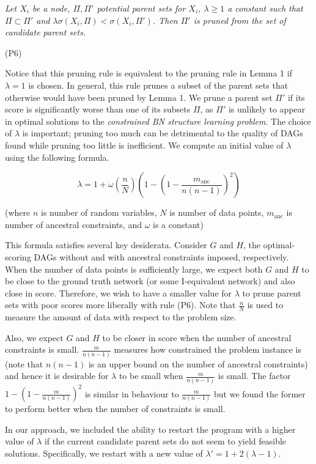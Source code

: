 \documentclass[twoside,11pt]{article}
\begin{document}
\bigskip
\emph{
Let $X_i$ be a node, $\Pi, \Pi'$ potential parent sets for $X_i$, $\lambda \ge 1$ a constant such that 
$\Pi \subset \Pi'$ and $\lambda \sigma(X_i, \Pi) <  \sigma(X_i, \Pi')$. Then $\Pi'$ is
pruned from the set of candidate parent sets.
}
\begin{flushright}
(P6)
\end{flushright}

\bigskip
Notice that this pruning rule is equivalent to the pruning rule in Lemma 1 if $\lambda = 1$ is chosen. In general, this rule prunes a subset of the parent sets that
otherwise would have been pruned by Lemma 1. We prune a parent set $\Pi'$ if its score is significantly worse than one of its subsets $\Pi$, as $\Pi'$ is unlikely to appear in
optimal solutions to the \emph{constrained BN structure learning problem}. The choice of $\lambda$ is important; pruning too much can be detrimental to the quality of DAGs found while pruning too little is inefficient. We compute an initial value of $\lambda$ using the following formula.

$$\lambda = 1 + \omega (\frac{n}{N})(1 - (1 - \frac{m_{\text{anc}}}{n(n-1)})^2)$$

(where $n$ is number of random variables, $N$ is number of data points, $m_{\text{anc}}$ is number of 
ancestral constraints, and $\omega$ is a constant)

\medskip
This formula satisfies several key desiderata. Consider $G$ and $H$, the optimal-scoring DAGs without and with ancestral constraints imposed, respectively. 
When the number of data points is sufficiently large, we expect both $G$ and $H$ to be close to the ground truth network (or some I-equivalent network) and
also close in score. Therefore, we wish to have a smaller value for $\lambda$ to prune parent sets with poor scores more liberally with rule (P6). Note that
$\frac{n}{N}$ is used to measure the amount of data with respect to the problem size.

\medskip
Also, we expect $G$ and $H$ to be closer in score when the number of ancestral constraints is small. $\frac{m}{n(n-1)}$ measures how constrained
the problem instance is (note that $n(n-1)$ is an upper bound on the number of ancestral constraints) and hence it is desirable for $\lambda$ to be small
when $\frac{m}{n(n-1)}$ is small. The factor $1 - (1-\frac{m}{n(n-1)})^2$ is similar in behaviour to $\frac{m}{n(n-1)}$ but we found the former to perform
better when the number of constraints is small. 

\medskip
In our approach, we included the ability to restart the program with a higher value of $\lambda$ if the current candidate parent sets do not seem to yield
feasible solutions. Specifically, we restart with a new value of $\lambda' = 1 + 2(\lambda - 1)$.
\end{document}
